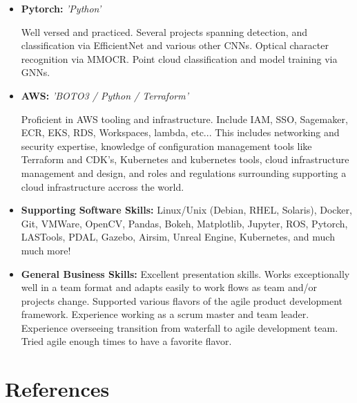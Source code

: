\documentclass[11pt,a4paper,sans]{moderncv}        %
\begin{document}
\begin{itemize}

\item{\textbf{Pytorch:} \textit{'Python'}

\vspace{3pt}

\small{ Well versed and practiced. Several projects spanning detection, and classification via EfficientNet and various other CNNs. Optical character recognition via MMOCR. Point cloud classification and model training via GNNs. }}

\vspace{5pt}

\item{\textbf{AWS:} \textit{'BOTO3 / Python / Terraform'}

\vspace{3pt}

\small{ Proficient in AWS tooling and infrastructure. Include IAM, SSO, Sagemaker, ECR, EKS, RDS, Workspaces, lambda, etc... This includes networking and security expertise, knowledge of configuration management tools like Terraform and CDK's, Kubernetes and kubernetes tools, cloud infrastructure management and design, and roles and regulations surrounding supporting a cloud infrastructure accross the world.  }}

\vspace{5pt}

\item \textbf{Supporting Software Skills:} Linux/Unix (Debian, RHEL, Solaris), Docker, Git, VMWare, OpenCV, Pandas, Bokeh, Matplotlib, Jupyter, ROS, Pytorch, LASTools, PDAL, Gazebo, Airsim, Unreal Engine, Kubernetes, and much much more!

\vspace{5pt}

\item \textbf{General Business Skills:} Excellent presentation skills. Works exceptionally well in a team format and adapts easily to work flows as team and/or projects change. Supported various flavors of the agile product development framework. Experience working as a scrum master and team leader. Experience overseeing transition from waterfall to agile development team. Tried agile enough times to have a favorite flavor.

\end{itemize}

\section{References}
\end{document}
